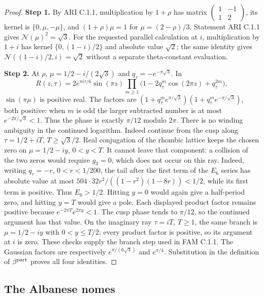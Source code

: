 \documentclass[11pt,a4paper]{article}
\theoremstyle{plain}
\theoremstyle{definition}
\begin{document}
\begin{proof}
\noindent\textbf{Step 1.} By ARI C.1.1, multiplication by $1+\rho$ has matrix
$\left(\begin{smallmatrix}1&-1\\1&2\end{smallmatrix}\right)$,
its kernel is $\{0,\mu,-\mu\}$, and $(1+\rho)\mu=1$ for
$\mu=(2-\rho)/3$. Statement ARI C.1.1 gives $\mathcal N(\mu)^2=\sqrt3$.
For the requested parallel calculation at $i$, multiplication by $1+i$
has kernel $\{0,(1-i)/2\}$ and absolute value $\sqrt2$; the same
identity gives $\mathcal N((1-i)/2,i)=\sqrt2$ without a separate theta-constant
evaluation.


\noindent\textbf{Step 2.} At $\rho$, $\mu=1/2-i/(2\sqrt3)$ and $q_\tau=-e^{-\pi\sqrt3}$. In
\[
 R(z,\tau)=2e^{\pi i\tau/6}\sin(\pi z)
 \prod_{m\ge1}\bigl(1-2q_\tau^m\cos(2\pi z)+q_\tau^{2m}\bigr),
\]
$\sin(\pi\mu)$ is positive real. The factors are
$(1+q_\tau^m e^{\pi/\sqrt3})(1+q_\tau^m e^{-\pi/\sqrt3})$, both positive:
when $m$ is odd the larger subtracted number is at most
$e^{-2\pi/\sqrt3}<1$. Thus the phase is exactly $\pi/12$ modulo
$2\pi$. There is no winding ambiguity in the continued logarithm.
Indeed continue from the cusp along $\tau=1/2+iT$,
$T\ge\sqrt3/2$. Real conjugation of the rhombic lattice keeps the
chosen zero on $\mu=1/2-iy$, $0<y<T$. It cannot leave that component:
a collision of the two zeros would require $g_3=0$, which does not
occur on this ray. Indeed, writing $q_\tau=-r$, $0<r<1/200$,
the tail after the first term of the $E_6$ series has absolute value
at most $504\cdot32r^2/((1-r^2)(1-8r))<1/2$, while its
first term is positive. Thus $E_6>1/2$. Hitting $y=0$ would again give a half-period zero, and
hitting $y=T$ would give a pole. Each displayed product factor remains
positive because $e^{-2\pi T}e^{2\pi y}<1$. The cusp phase tends to
$\pi/12$, so the continued argument has that value. On the imaginary
ray $\tau=iT$, $T\ge1$, the same branch is
$\mu=1/2-iy$ with $0<y\le T/2$; every product factor is positive,
so its argument at $i$ is zero. These checks supply the branch step
used in FAM C.1.1. The Gaussian factors are respectively
$e^{\pi/(6\sqrt3)}$ and $e^{\pi/4}$. Substitution in the definition of
$\beta^{\rm part}$ proves all four identities.
\end{proof}

\subsection{The Albanese nomes}
\end{document}
